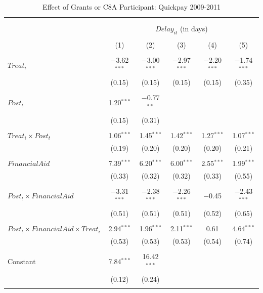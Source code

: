 \documentclass[
]{article}
\begin{document}
\begin{table}[H] \centering 
  \caption{Effect of Grants or C8A Participant: Quickpay 2009-2011} 
  \label{} 
\small 
\begin{tabular}{@{\extracolsep{-2pt}}lccccc} 
\\[-1.8ex]\hline 
\hline \\[-1.8ex] 
\\[-1.8ex] & \multicolumn{5}{c}{$Delay_{it}$ (in days)} \\ 
\\[-1.8ex] & (1) & (2) & (3) & (4) & (5)\\ 
\hline \\[-1.8ex] 
 $Treat_i$ & $-$3.62$^{***}$ & $-$3.00$^{***}$ & $-$2.97$^{***}$ & $-$2.20$^{***}$ & $-$1.74$^{***}$ \\ 
  & (0.15) & (0.15) & (0.15) & (0.15) & (0.35) \\ 
  & & & & & \\ 
 $Post_t$ & 1.20$^{***}$ & $-$0.77$^{**}$ &  &  &  \\ 
  & (0.15) & (0.31) &  &  &  \\ 
  & & & & & \\ 
 $Treat_i \times Post_t$ & 1.06$^{***}$ & 1.45$^{***}$ & 1.42$^{***}$ & 1.27$^{***}$ & 1.07$^{***}$ \\ 
  & (0.19) & (0.20) & (0.20) & (0.20) & (0.21) \\ 
  & & & & & \\ 
 $FinancialAid$ & 7.39$^{***}$ & 6.20$^{***}$ & 6.00$^{***}$ & 2.55$^{***}$ & 1.99$^{***}$ \\ 
  & (0.33) & (0.32) & (0.32) & (0.33) & (0.55) \\ 
  & & & & & \\ 
 $Post_t \times FinancialAid$ & $-$3.31$^{***}$ & $-$2.38$^{***}$ & $-$2.26$^{***}$ & $-$0.45 & $-$2.43$^{***}$ \\ 
  & (0.51) & (0.51) & (0.51) & (0.52) & (0.65) \\ 
  & & & & & \\ 
 $Post_t \times FinancialAid \times Treat_i$ & 2.94$^{***}$ & 1.96$^{***}$ & 2.11$^{***}$ & 0.61 & 4.64$^{***}$ \\ 
  & (0.53) & (0.53) & (0.53) & (0.54) & (0.74) \\ 
  & & & & & \\ 
 Constant & 7.84$^{***}$ & 16.42$^{***}$ &  &  &  \\ 
  & (0.12) & (0.24) &  &  &  \\ 
  & & & & & \\ 

\end{tabular}
\end{table}
\end{document}
